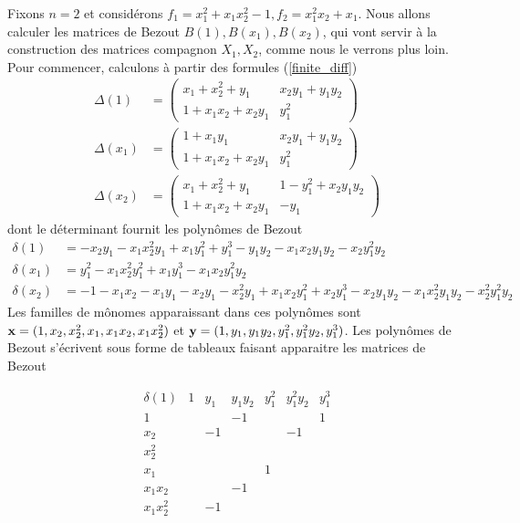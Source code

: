 \documentclass{standalone}
\begin{document}
\begin{exmp}
\label{ex_bez_multi}
Fixons $n = 2$ et considérons $f_1 = x_1^2 + x_1x_2^2 - 1, f_2 = x_1^2x_2 + x_1$.
Nous allons calculer les matrices de Bezout $B(1), B(x_1), B(x_2)$,  qui vont servir à la construction des matrices compagnon $X_1, X_2$, comme nous le verrons plus loin. Pour commencer, calculons à partir des formules (\ref{finite_diff})
\begin{align}
\Delta(1) &=
\begin{pmatrix}
x_1 + x_2^2 + y_1 & x_2y_1 + y_1y_2 \\
1 + x_1x_2 + x_2y_1 & y_1^2
\end{pmatrix} \nonumber  \\
\Delta(x_1) &=
\begin{pmatrix}
1 + x_1y_1 & x_2y_1 + y_1y_2 \\
1 + x_1x_2 + x_2y_1 & y_1^2
\end{pmatrix} \nonumber  \\
\Delta(x_2) &=
\begin{pmatrix}
x_1 + x_2^2 + y_1 & 1 - y_1^2 + x_2y_1y_2 \\
1 + x_1x_2 + x_2y_1  & -y_1
\end{pmatrix} \nonumber
\end{align}
dont le déterminant fournit les polynômes de Bezout
\begin{align}
\delta(1) &= -x_2y_1 - x_1x_2^2y_1 + x_1y_1^2 + y_1^3 - y_1y_2 - x_1x_2y_1y_2 - x_2y_1^2y_2 \nonumber \\
\delta(x_1) &=  y_1^2 - x_1x_2^2y_1^2 + x_1y_1^3 - x_1x_2y_1^2y_2 \nonumber \\
\delta(x_2) &= -1 - x_1x_2 - x_1y_1 -x_2y_1 - x_2^2y_1 + x_1x_2y_1^2 + x_2y_1^3 - x_2y_1y_2 - x_1x_2^2y_1y_2 - x_2^2y_1^2y_2\nonumber
\end{align}
Les familles de mônomes apparaissant dans ces polynômes sont
$\bold{x} = (1, x_2, x_2^2, x_1, x_1x_2, x_1x_2^2)$ et $\bold{y} = (1, y_1, y_1y_2, y_1^2, y_1^2y_2, y_1^3)$.
Les polynômes de Bezout s'écrivent sous forme de tableaux faisant apparaitre les matrices de Bezout


$$\begin{array}{c|cccccc}
	\delta(1) & 1 & y_1 & y_1y_2 & y_1^2 & y_1^2y_2 & y_1^3 \\
	\hline
	1 &  &  & -1 &  &  & 1\\
	x_2 &  & -1 &  &  & -1 & \\
	x_2^2 &  &  &  &  &  & \\
	x_1 &  &  &  & 1 &  & \\
	x_1x_2 &  &  & -1 &  &  & \\
	x_1x_2^2 &  & -1 &  &  &  &
\end{array}$$


\end{exmp}
\end{document}
